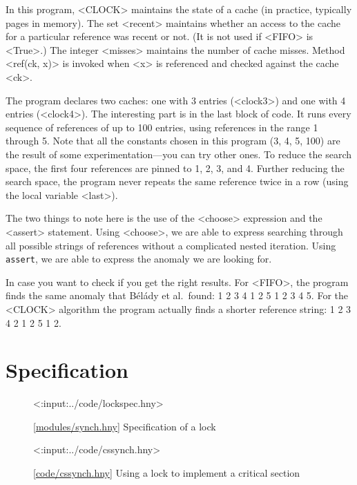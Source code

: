 \documentclass{report}
\newcommand{\harmonylink}[1]{%
[\href{https://harmony.cs.cornell.edu/#1}{\underline{#1}}]%
}
\newenvironment{code}{
\tcolorbox
}{
\endtcolorbox
}
\begin{document}
In this program, <{CLOCK}> maintains the state of a cache
(in practice, typically pages in memory).
The set <{recent}> maintains whether an access to the cache
for a particular reference was recent or not.
(It is not used if <{FIFO}> is <{True}>.)
The integer <{misses}> maintains the number of cache misses.
Method <{ref(ck, x)}> is invoked when <{x}> is
referenced and checked against the cache <{ck}>.

The program declares two caches: one with 3 entries (<{clock3}>)
and one with 4 entries (<{clock4}>).
The interesting part is in the last block of code.
It runs every sequence of references of up to 100 entries, using
references in the range 1 through 5.
Note that all the constants chosen in this program (3, 4, 5, 100)
are the result of some experimentation---you can try other ones.
To reduce the search space, the first four references are pinned
to 1, 2, 3, and 4.
Further reducing the search space, the program never repeats the
same reference twice in a row (using the local variable <{last}>).

The two things to note here is the use of the <{choose}>
expression and the <{assert}> statement.  Using <{choose}>,
we are able to express searching through all possible strings of
references without a complicated nested iteration.
Using \texttt{assert}, we are able to express the anomaly we are
looking for.

In case you want to check if you get the right results.  For <{FIFO}>,
the program finds the same anomaly that
B\'{e}l\'{a}dy et al.~found: 1 2 3 4 1 2 5 1 2 3 4 5.
For the <{CLOCK}> algorithm the program actually finds a shorter
reference string: 1 2 3 4 2 1 2 5 1 2.

\chapter{Specification}
\label{ch:specification}

\begin{figure}
\begin{code}
<{:input:../code/lockspec.hny}>
\end{code}
\caption{\harmonylink{modules/synch.hny} Specification of a lock}
\label{fig:lockspec}
\end{figure}

\begin{figure}
\begin{code}
<{:input:../code/cssynch.hny}>
\end{code}
\caption{\harmonylink{code/cssynch.hny} Using a lock to implement a
critical section}
\label{fig:cssynch}
\end{figure}
\end{document}
